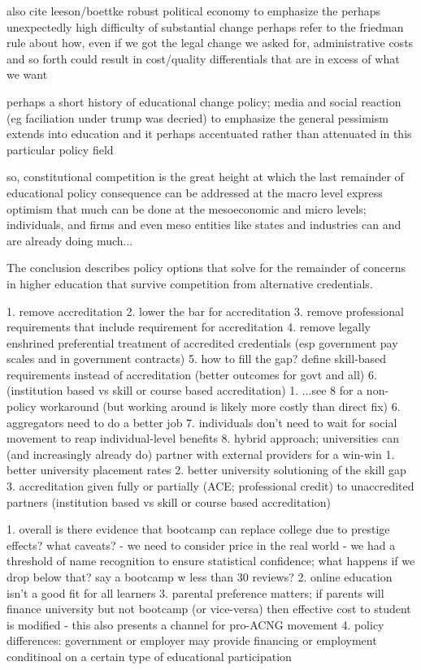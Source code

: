 \documentclass[review]{elsarticle}
\begin{document}
also cite leeson/boettke robust political economy to emphasize the perhaps unexpectedly high difficulty of substantial change
perhaps refer to the friedman rule about how, even if we got the legal change we asked for,
administrative costs and so forth could result in cost/quality differentials that are in excess of what we want

perhaps a short history of educational change policy; media and social reaction (eg faciliation under trump was decried)
to emphasize the general pessimism extends into education and it perhaps accentuated rather than attenuated in this particular policy field

so, constitutional competition is the great height at which the last remainder of educational policy consequence can be addressed at the macro level
express optimism that much can be done at the mesoeconomic and micro levels; individuals, and firms and even meso entities like states and industries
can and are already doing much...

The conclusion describes policy options that solve for the remainder of concerns in higher education that survive competition from alternative credentials.

1. remove accreditation
2. lower the bar for accreditation
3. remove professional requirements that include requirement for accreditation
4. remove legally enshrined preferential treatment of accredited credentials (esp government pay scales and in government contracts)
5. how to fill the gap? define skill-based requirements instead of accreditation (better outcomes for govt and all)
6. (institution based vs skill or course based accreditation)
    1. ...see 8 for a non-policy workaround (but working around is likely more costly than direct fix)
6. aggregators need to do a better job
7. individuals don't need to wait for social movement to reap individual-level benefits
8. hybrid approach; universities can (and increasingly already do) partner with external providers for a win-win
    1. better university placement rates
    2. better university solutioning of the skill gap
    3. accreditation given fully or partially (ACE; professional credit) to unaccredited partners (institution based vs skill or course based accreditation)

1. overall is there evidence that bootcamp can replace college due to prestige effects? what caveats?
- we need to consider price in the real world
- we had a threshold of name recognition to ensure statistical confidence; what happens if we drop below that? say a bootcamp w less than 30 reviews?
2. online education isn't a good fit for all learners
3. parental preference matters; if parents will finance university but not bootcamp (or vice-versa) then effective cost to student is modified
- this also presents a channel for pro-ACNG movement
4. policy differences: government or employer may provide financing or employment conditinoal on a certain type of educational participation
\end{document}
